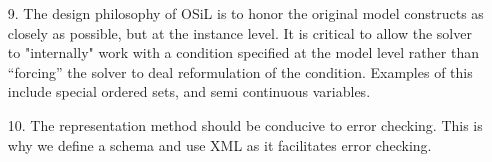 \begin{itemize}
\item[9.]  The design philosophy of OSiL is to honor the original model constructs as closely as possible, but at the instance level.  It is critical to  allow the solver to "internally"  work with a  condition specified at the model level  rather than ``forcing'' the solver to  deal reformulation of the condition. Examples of this include special ordered sets, and semi continuous variables.  

\item[10.] The representation method should be conducive to error checking. This is why we define a schema and use XML as it facilitates error checking. 



\end{itemize}

